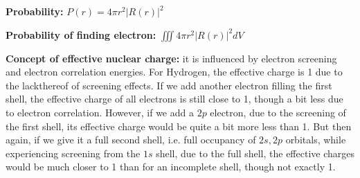 \documentclass[11pt,fleqn]{book}
\begin{document}
\textbf{Probability: }$P(r)=4\pi r^2|R(r)|^2$

\textbf{Probability of finding electron: }$\iiint4\pi r^2|R(r)|^2dV$

\textbf{Concept of effective nuclear charge: }it is influenced by electron screening and electron correlation energies. For Hydrogen, the effective charge is 1 due to the lackthereof of screening effects. If we add another electron filling the first shell, the effective charge of all electrons is still close to 1, though a bit less due to electron correlation. However, if we add a $2p$ electron, due to the screening of the first shell, its effective charge would be quite a bit more less than 1. But then again, if we give it a full second shell, i.e. full occupancy of $2s,2p$ orbitals, while experiencing screening from the $1s$ shell, due to the full shell, the effective charges would be much closer to 1 than for an incomplete shell, though not exactly 1.
\end{document}
